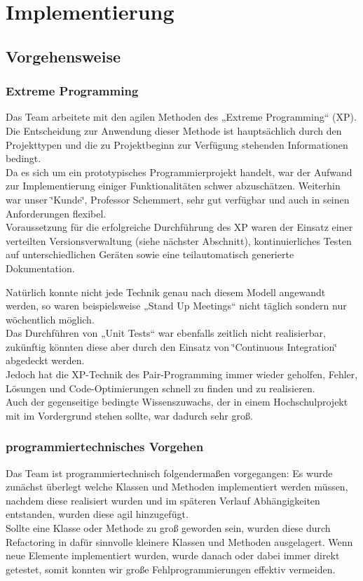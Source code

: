 \documentclass[a4paper,ngerman,12pt]{scrreprt}
\newcommand{\+}{\discretionary{\mbox{\scriptsize$\hookleftarrow$}}{}{}}
\begin{document}
\chapter{Implementierung}
\section{Vorgehensweise}
\subsection{Extreme Programming}

Das Team arbeitete mit den agilen Methoden des „\+Extreme Programming“ (XP). Die Entscheidung zur Anwendung dieser Methode ist hauptsächlich durch den Projekttypen und die zu Projektbeginn zur Verfügung stehenden Informationen bedingt. \\
Da es sich um ein prototypisches Programmierprojekt handelt, war der Aufwand zur Implementierung einiger Funktionalitäten schwer abzuschätzen. Weiterhin war unser \char`\"{}\+Kunde\char`\"{}, Professor Schemmert, sehr gut verfügbar und auch in seinen Anforderungen flexibel.\\ Voraussetzung für die erfolgreiche Durchführung des XP waren der Einsatz einer verteilten Versionsverwaltung (siehe nächster Abschnitt), kontinuierliches Testen auf unterschiedlichen Geräten sowie eine teilautomatisch generierte Dokumentation.

Natürlich konnte nicht jede Technik genau nach diesem Modell angewandt werden, so waren beispielsweise „\+Stand Up Meetings“ nicht täglich sondern nur wöchentlich möglich.\\ 
Das Durchführen von „\+Unit Tests“ war ebenfalls zeitlich nicht realisierbar, zukünftig könnten diese aber durch den Einsatz von \char`\"{}\+\ac{Continuous Integration}\char`\"{} abgedeckt werden. \\
Jedoch hat die X\+P-\/\+Technik des Pair-\/\+Programming immer wieder geholfen, Fehler, Lösungen und Code-\/\+Optimierungen schnell zu finden und zu realisieren. \\
Auch der gegenseitige bedingte Wissenszuwachs, der in einem Hochschulprojekt mit im Vordergrund stehen sollte, war dadurch sehr groß.

\subsection{programmiertechnisches Vorgehen}

Das Team ist programmiertechnisch folgendermaßen vorgegangen\+: Es wurde zunächst überlegt welche Klassen und Methoden implementiert werden müssen, nachdem diese realisiert wurden und im späteren Verlauf Abhängigkeiten entstanden, wurden diese agil hinzugefügt. \\
Sollte eine Klasse oder Methode zu groß geworden sein, wurden diese durch \ac{Refactoring} in dafür sinnvolle kleinere Klassen und Methoden ausgelagert. Wenn neue Elemente implementiert wurden, wurde danach oder dabei immer direkt getestet, somit konnten wir große Fehlprogrammierungen effektiv vermeiden.
\end{document}
